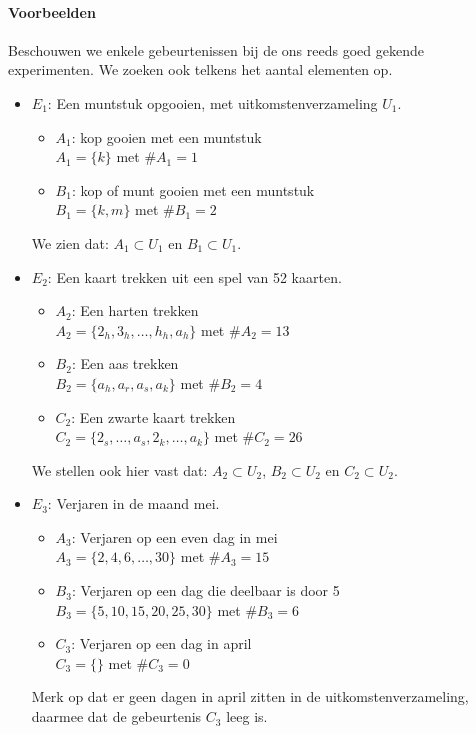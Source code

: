 \documentclass[12pt,twoside]{article}
\begin{document}
\paragraph*{Voorbeelden} Beschouwen we enkele gebeurtenissen bij de ons reeds goed gekende experimenten.
We zoeken ook telkens het aantal elementen op.
\begin{itemize}
  \item $E_1$: Een muntstuk opgooien, met uitkomstenverzameling $U_1$.
  \begin{itemize}
    \item $A_1$: kop gooien met een muntstuk\\
    $A_1=\{k\}$ met $\#A_1=1$
    \item $B_1$: kop of munt gooien met een muntstuk\\
    $B_1=\{k, m\}$ met $\#B_1=2$
  \end{itemize}
  We zien dat: $A_1\subset U_1$ en $B_1\subset U_1$.
  \item $E_2$: Een kaart trekken uit een spel van 52 kaarten.
  \begin{itemize}
    \item $A_2$: Een harten trekken\\
    $A_2=\{2_h, 3_h, \ldots, h_h, a_h\}$ met $\#A_2=13$
    \item $B_2$: Een aas trekken\\
    $B_2=\{a_h, a_r, a_s, a_k\}$ met $\#B_2=4$
    \item $C_2$: Een zwarte kaart trekken\\
    $C_2=\{2_s, \ldots, a_s, 2_k, \ldots, a_k\}$ met $\#C_2=26$
  \end{itemize}
  We stellen ook hier vast dat: $A_2\subset U_2$, $B_2\subset U_2$ en $C_2\subset U_2$.
  \item $E_3$: Verjaren in de maand mei.
  \begin{itemize}
    \item $A_3$: Verjaren op een even dag in mei\\
    $A_3=\{2,4,6,\ldots,30\}$ met $\#A_3=15$
    \item $B_3$: Verjaren op een dag die deelbaar is door 5\\
    $B_3=\{5,10,15,20,25,30\}$ met $\#B_3=6$
    \item $C_3$: Verjaren op een dag in april\\
    $C_3=\{\}$ met $\#C_3=0$
  \end{itemize}
  Merk op dat er geen dagen in april zitten in de uitkomstenverzameling, daarmee dat de gebeurtenis $C_3$ leeg is.
\end{itemize}
\end{document}
